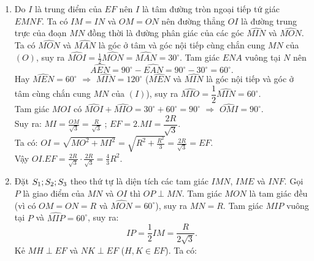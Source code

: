 \begin{ex}
{\begin{enumerate}
\begin{center}
\end{center}
 \item Do $I$ là trung điểm của ${{EF}}$ nên $I$ là tâm đường tròn ngoại tiếp tứ giác $EMNF$. 
    Ta có $IM = IN$ và $OM = ON$ nên đường thẳng $OI$ là đường trung trực của đoạn $MN$ đồng thời là đường phân giác của các góc $\widehat {MIN}$ và $\widehat {MON}$.
    Ta có 
    $\widehat {MON}$ và $\widehat {MAN}$ là góc ở tâm và góc nội tiếp cùng chắn cung $MN$ của $(O)$, suy ra
    $\displaystyle\widehat {MOI} = \frac{1}{2}\widehat {MON} = \widehat {MAN} = {30^\circ}$.
    Tam giác $ENA$ vuông tại $N$ nên 
    $$\widehat {AEN} = {90^\circ} - \widehat {E{{A}}N} = {90^\circ} - {30^\circ} = {60^\circ}.$$
    Hay $\widehat {MEN} = {60^\circ}$ $ \Rightarrow $ $\widehat {MIN} = {120^\circ}$ ($\widehat {MEN}$ và $\widehat {MIN}$ là góc nội tiếp và góc ở tâm cùng chắn cung $MN$ của $(I)$), suy ra
    $\widehat {MI{{O}}} = \dfrac{1}{2}\widehat {MIN} = {60^\circ}$.\\
    Tam giác $MOI$ có $\displaystyle\widehat {MOI} + \widehat {MI{{O}}} = {30^\circ} + {60^\circ} = {90^\circ}$ $ \Rightarrow $ $\widehat {OMI} = {90^\circ}$.\\
    Suy ra: $\displaystyle MI = \frac{{OM}}{{\sqrt 3 }} = \frac{R}{{\sqrt 3 }}$  ; ${{EF}} = 2.MI = \dfrac{{2{{R}}}}{{\sqrt 3 }}$.\\
    Ta có: $\displaystyle OI = \sqrt {M{O^2} + M{I^2}}  = \sqrt {{R^2} + \frac{{{R^2}}}{3}}  = \frac{{2R}}{{\sqrt 3 }} = EF$.\\
    Vậy $\displaystyle OI.EF = \frac{{2R}}{{\sqrt 3 }} \cdot \frac{{2R}}{{\sqrt 3 }} = \frac{4}{3}{R^2}$.
 \item 
    Đặt ${S_1};{\rm{ }}{S_2};{\rm{ }}{S_3}$ theo thứ tự là diện tích các tam giác $IMN$, $IM{{E}}$ và ${{INF}}$.
    Gọi $P$ là giao điểm của $MN$ và $OI$ thì $OP \perp MN$.
    Tam giác $MON$ là tam giác đều (vì có $OM = ON = R$ và $\widehat {MON} = {60^\circ}$),
    suy ra $MN = R$.
    Tam giác $MIP$ vuông tại $P$ và $\widehat {MIP} = {60^\circ}$, suy ra:
    $$IP = \dfrac{1}{2}IM = \dfrac{R}{{2\sqrt 3 }}.$$
    Kẻ $MH \perp EF$ và $NK \perp EF$ ($H,K \in EF$).
    Ta có:
    {\allowdisplaybreaks
}
\end{enumerate}}
\end{ex}
